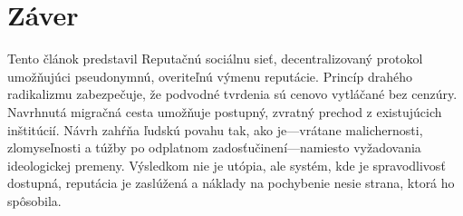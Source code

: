 \documentclass[11pt,a4paper,twocolumn]{article}
\begin{document}
\section{Záver}

Tento článok predstavil Reputačnú sociálnu sieť, decentralizovaný protokol umožňujúci pseudonymnú, overiteľnú výmenu reputácie. Princíp drahého radikalizmu zabezpečuje, že podvodné tvrdenia sú cenovo vytláčané bez cenzúry. Navrhnutá migračná cesta umožňuje postupný, zvratný prechod z existujúcich inštitúcií. Návrh zahŕňa ľudskú povahu tak, ako je---vrátane malichernosti, zlomyseľnosti a túžby po odplatnom zadosťučinení---namiesto vyžadovania ideologickej premeny. Výsledkom nie je utópia, ale systém, kde je spravodlivosť dostupná, reputácia je zaslúžená a náklady na pochybenie nesie strana, ktorá ho spôsobila.


\end{document}
